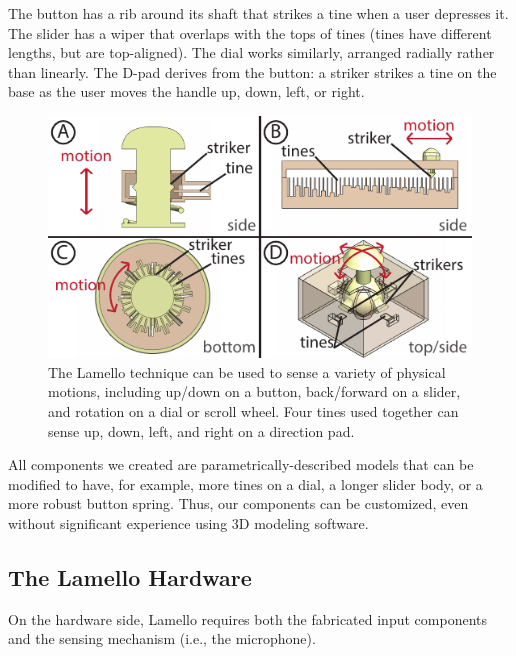         The button has a rib around its shaft that strikes a tine when a user depresses it. The slider has a wiper that overlaps with the tops of tines (tines have different lengths, but are top-aligned). The dial works similarly, arranged radially rather than linearly. The D-pad derives from the button: a striker strikes a tine on the base as the user moves the handle up, down, left, or right.
        
        \begin{figure}
  \centering
    \includegraphics[width=\textwidth]{figures/lamello/component-schematics.pdf}
  \caption{The Lamello technique can be used to sense a variety of physical motions, including up/down on a button, back/forward on a slider, and rotation on a dial or scroll wheel. Four tines used together can sense up, down, left, and right on a direction pad. %
  }
  \label{fig:lamello-allcomponents}
\end{figure}

        All components we created are parametrically-described models that can be modified to have, for example, more tines on a dial, a longer slider body, or a more robust button spring. Thus, our components can be customized, even without significant experience using 3D modeling software.

    \subsection{The Lamello Hardware}
    
    On the hardware side, Lamello requires both the fabricated input components and the sensing mechanism (i.e., the microphone).
    
